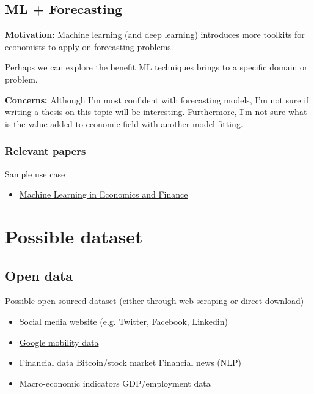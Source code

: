 \documentclass[11pt, oneside]{article}   	%
\begin{document}
    \subsection{ML + Forecasting}

    \textbf{Motivation:} Machine learning (and deep learning) introduces more toolkits for economists to apply on
    forecasting problems.

    Perhaps we can explore the benefit ML techniques brings to a specific domain or problem.

    \textbf{Concerns:} Although I'm most confident with forecasting models, I'm not sure if writing a thesis
    on this topic will be interesting. Furthermore, I'm not sure what is the value added to economic field
    with another model fitting.

    \subsubsection{Relevant papers}
    Sample use case
    \begin{itemize}
        \item \href{https://link-springer-com.libproxy1.nus.edu.sg/article/10.1007/s10614-021-10094-w}{Machine Learning
            in Economics and Finance}
    \end{itemize}

\section{Possible dataset}

    \subsection{Open data}

    Possible open sourced dataset (either through web scraping or direct download)

    \begin{itemize}
        \item Social media website (e.g. Twitter, Facebook, Linkedin)
        \item \href{https://www.google.com/covid19/mobility/}{Google mobility data}
        \item Financial data
            \subitem Bitcoin/stock market
            \subitem Financial news (NLP)
        \item Macro-economic indicators
            \subitem GDP/employment data
    \end{itemize}
\end{document}
